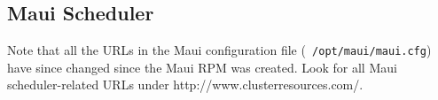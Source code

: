 %
% 
% 
% 
% 
%

\subsection{Maui Scheduler}

Note that all the URLs in the Maui configuration file ({\tt
  /opt/maui/maui.cfg}) have since changed since the Maui RPM was
created.  Look for all Maui scheduler-related URLs under
  http://www.clusterresources.com/. 

